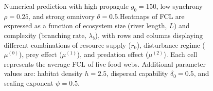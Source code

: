 \begin{figure}
\centering
{}
\caption{Numerical prediction with high propagule \(g_0 = 150\), low
synchrony \(\rho = 0.25\), and strong omnivory \(\theta = 0.5\).Heatmaps
of FCL are expressed as a function of ecosystem size (river length,
\(L\)) and complexity (branching rate, \(\lambda_b\)), with rows and
columns displaying different combinations of resource supply (\(r_0\)),
disturbance regime (\(\mu^{(0)}\)), prey effect (\(\mu^{(1)}\)), and
predation effect (\(\mu^{(2)}\)). Each cell represents the average FCL
of five food webs. Additional parameter values are: habitat density
\(h=2.5\), dispersal capability \(\delta_0=0.5\), and scaling exponent
\(\psi=0.5\).}
\end{figure}

\newpage


